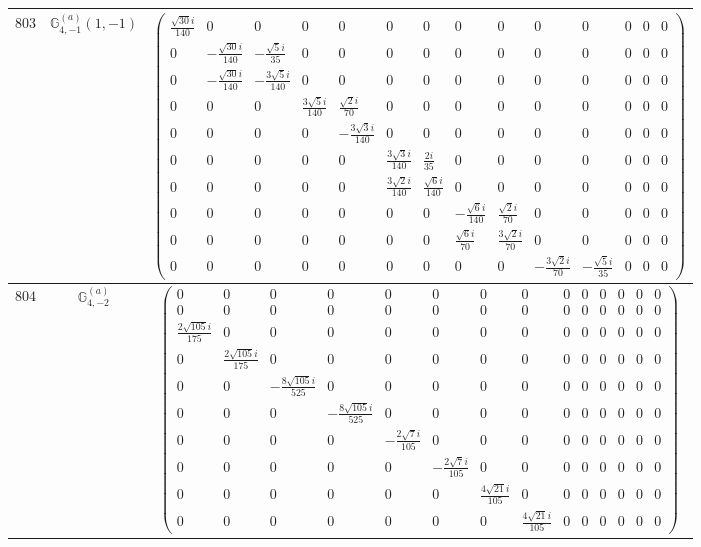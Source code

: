 \documentclass[fleqn,8pt,landscape]{jsarticle}
\begin{document}
\begin{center}
\begin{longtable}{ccc}
$ 803 $ & $ \mathbb{G}_{4,-1}^{(a)}(1,-1) $ & $ \begin{pmatrix} \frac{\sqrt{30} i}{140} & 0 & 0 & 0 & 0 & 0 & 0 & 0 & 0 & 0 & 0 & 0 & 0 & 0 \\ 0 & - \frac{\sqrt{30} i}{140} & - \frac{\sqrt{5} i}{35} & 0 & 0 & 0 & 0 & 0 & 0 & 0 & 0 & 0 & 0 & 0 \\ 0 & - \frac{\sqrt{30} i}{140} & - \frac{3 \sqrt{5} i}{140} & 0 & 0 & 0 & 0 & 0 & 0 & 0 & 0 & 0 & 0 & 0 \\ 0 & 0 & 0 & \frac{3 \sqrt{5} i}{140} & \frac{\sqrt{2} i}{70} & 0 & 0 & 0 & 0 & 0 & 0 & 0 & 0 & 0 \\ 0 & 0 & 0 & 0 & - \frac{3 \sqrt{3} i}{140} & 0 & 0 & 0 & 0 & 0 & 0 & 0 & 0 & 0 \\ 0 & 0 & 0 & 0 & 0 & \frac{3 \sqrt{3} i}{140} & \frac{2 i}{35} & 0 & 0 & 0 & 0 & 0 & 0 & 0 \\ 0 & 0 & 0 & 0 & 0 & \frac{3 \sqrt{2} i}{140} & \frac{\sqrt{6} i}{140} & 0 & 0 & 0 & 0 & 0 & 0 & 0 \\ 0 & 0 & 0 & 0 & 0 & 0 & 0 & - \frac{\sqrt{6} i}{140} & \frac{\sqrt{2} i}{70} & 0 & 0 & 0 & 0 & 0 \\ 0 & 0 & 0 & 0 & 0 & 0 & 0 & \frac{\sqrt{6} i}{70} & \frac{3 \sqrt{2} i}{70} & 0 & 0 & 0 & 0 & 0 \\ 0 & 0 & 0 & 0 & 0 & 0 & 0 & 0 & 0 & - \frac{3 \sqrt{2} i}{70} & - \frac{\sqrt{5} i}{35} & 0 & 0 & 0 \end{pmatrix} $ \\ \hline
$ 804 $ & $ \mathbb{G}_{4,-2}^{(a)} $ & $ \begin{pmatrix} 0 & 0 & 0 & 0 & 0 & 0 & 0 & 0 & 0 & 0 & 0 & 0 & 0 & 0 \\ 0 & 0 & 0 & 0 & 0 & 0 & 0 & 0 & 0 & 0 & 0 & 0 & 0 & 0 \\ \frac{2 \sqrt{105} i}{175} & 0 & 0 & 0 & 0 & 0 & 0 & 0 & 0 & 0 & 0 & 0 & 0 & 0 \\ 0 & \frac{2 \sqrt{105} i}{175} & 0 & 0 & 0 & 0 & 0 & 0 & 0 & 0 & 0 & 0 & 0 & 0 \\ 0 & 0 & - \frac{8 \sqrt{105} i}{525} & 0 & 0 & 0 & 0 & 0 & 0 & 0 & 0 & 0 & 0 & 0 \\ 0 & 0 & 0 & - \frac{8 \sqrt{105} i}{525} & 0 & 0 & 0 & 0 & 0 & 0 & 0 & 0 & 0 & 0 \\ 0 & 0 & 0 & 0 & - \frac{2 \sqrt{7} i}{105} & 0 & 0 & 0 & 0 & 0 & 0 & 0 & 0 & 0 \\ 0 & 0 & 0 & 0 & 0 & - \frac{2 \sqrt{7} i}{105} & 0 & 0 & 0 & 0 & 0 & 0 & 0 & 0 \\ 0 & 0 & 0 & 0 & 0 & 0 & \frac{4 \sqrt{21} i}{105} & 0 & 0 & 0 & 0 & 0 & 0 & 0 \\ 0 & 0 & 0 & 0 & 0 & 0 & 0 & \frac{4 \sqrt{21} i}{105} & 0 & 0 & 0 & 0 & 0 & 0 \end{pmatrix} $ \\ \hline

\end{longtable}
\end{center}
\end{document}
